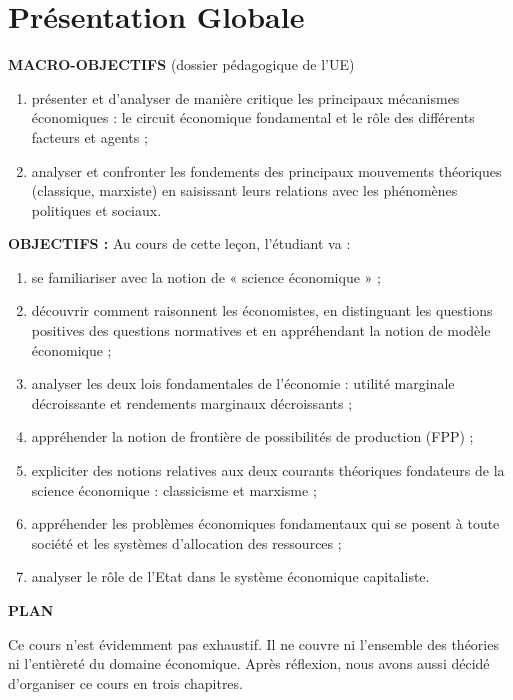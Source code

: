 \documentclass[
]{book}
\providecommand{\tightlist}{%
  \setlength{\itemsep}{0pt}\setlength{\parskip}{0pt}}
\begin{document}
\hypertarget{pruxe9sentation-globale}{%
\chapter*{Présentation Globale}\label{pruxe9sentation-globale}}

{\textbf{MACRO-OBJECTIFS }} (dossier pédagogique de l'UE)

\begin{enumerate}
\def\labelenumi{\arabic{enumi}.}
\tightlist
\item
  présenter et d'analyser de manière critique les principaux mécanismes économiques : le circuit
  économique fondamental et le rôle des différents facteurs et agents ;
\item
  analyser et confronter les fondements des principaux mouvements théoriques (classique, marxiste) en
  saisissant leurs relations avec les phénomènes politiques et sociaux.
\end{enumerate}

{\textbf{OBJECTIFS :}}
Au cours de cette leçon, l'étudiant va :

\begin{enumerate}
\def\labelenumi{\arabic{enumi}.}
\tightlist
\item
  se familiariser avec la notion de « science économique » ;
\item
  découvrir comment raisonnent les économistes, en distinguant les questions positives des questions normatives et en appréhendant la notion de modèle économique ;
\item
  analyser les deux lois fondamentales de l'économie : utilité marginale décroissante et rendements marginaux décroissants ;
\item
  appréhender la notion de frontière de possibilités de production (FPP) ;
\item
  expliciter des notions relatives aux deux courants théoriques fondateurs de la science économique :
  classicisme et marxisme ;
\item
  appréhender les problèmes économiques fondamentaux qui se posent à toute société et les
  systèmes d'allocation des ressources ;
\item
  analyser le rôle de l'Etat dans le système économique capitaliste.
\end{enumerate}

{\textbf{PLAN}}

Ce cours n'est évidemment pas exhaustif. Il ne couvre ni l'ensemble des théories ni l'entièreté du domaine économique. Après réflexion, nous avons aussi décidé d'organiser ce cours en trois chapitres.
\end{document}
